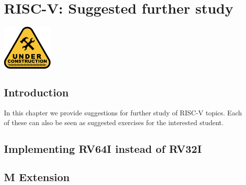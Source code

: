 

\chapter{RISC-V: Suggested further study}


\setcounter{page}{1}
\renewcommand{\thepage}{\arabic{chapter}-\arabic{page}}

\label{ch_RISCV_further_study}


\vspace{2ex}

\centerline{\includegraphics[width=1in,angle=0]{Figures/Fig_Under_Construction}}

\vspace{2ex}


\section{Introduction}

In this chapter we provide suggestions for further study of RISC-V
topics.  Each of these can also be seen as suggested exercises for the
interested student.


\section{Implementing RV64I instead of RV32I}


\section{M Extension}

